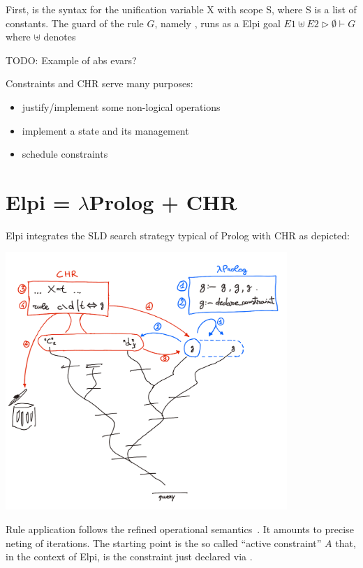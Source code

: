 \documentclass[a4paper, 11pt]{book}
\begin{document}
First,  is the syntax for the unification variable X
with scope S, where S is a list of constants. The guard of the rule $G$,
namely , runs as a Elpi goal
$E1 \uplus E2 \triangleright \emptyset \vdash G$ where $\uplus$ denotes

TODO: Example of abs evars?

Constraints and CHR serve many purposes:
\begin{itemize}
  \item justify/implement some non-logical operations
  \item implement a state and its management
  \item schedule constraints
\end{itemize}

\section{Elpi = $\lambda$Prolog + CHR}\label{sec:elpiLP+CHR}

Elpi integrates the SLD search strategy typical of Prolog with
CHR as depicted:

  \includegraphics[width=0.8\textwidth]{chr.png}



 
Rule application follows the refined operational semantics~\cite{10.1007/978-3-540-27775-0_7}.
It amounts to precise neting of iterations. The starting point is
the so called ``active constraint'' $A$ that, in the context of Elpi, is
the constraint just declared via .
\end{document}

